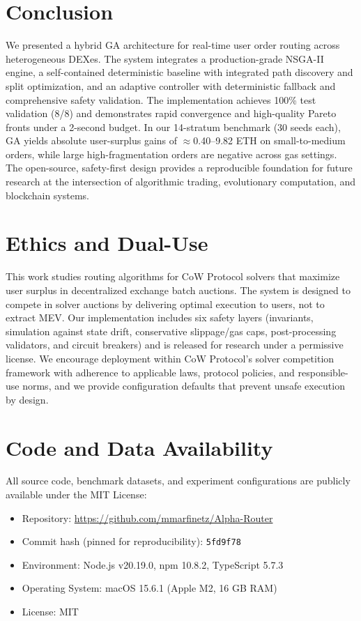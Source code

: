 \documentclass[11pt]{article}
\newcommand{\1}{\mathbf{1}}  %
\begin{document}
\section{Conclusion}
\label{sec:conclusion}
We presented a hybrid GA architecture for real-time user order routing across heterogeneous DEXes. The system integrates a production-grade NSGA-II engine, a self-contained deterministic baseline with integrated path discovery and split optimization, and an adaptive controller with deterministic fallback and comprehensive safety validation. The implementation achieves 100\% test validation (8/8) and demonstrates rapid convergence and high-quality Pareto fronts under a 2-second budget. In our 14-stratum benchmark (30 seeds each), GA yields absolute user-surplus gains of $\approx$0.40--9.82 ETH on small-to-medium orders, while large high-fragmentation orders are negative across gas settings. The open-source, safety-first design provides a reproducible foundation for future research at the intersection of algorithmic trading, evolutionary computation, and blockchain systems.

\section*{Ethics and Dual-Use}
This work studies routing algorithms for CoW Protocol solvers that maximize user surplus in decentralized exchange batch auctions. The system is designed to compete in solver auctions by delivering optimal execution to users, not to extract MEV. Our implementation includes six safety layers (invariants, simulation against state drift, conservative slippage/gas caps, post-processing validators, and circuit breakers) and is released for research under a permissive license. We encourage deployment within CoW Protocol's solver competition framework with adherence to applicable laws, protocol policies, and responsible-use norms, and we provide configuration defaults that prevent unsafe execution by design.

\section*{Code and Data Availability}
All source code, benchmark datasets, and experiment configurations are publicly available under the MIT License:
\begin{itemize}[leftmargin=*,nosep]
  \item Repository: \url{https://github.com/mmarfinetz/Alpha-Router}
  \item Commit hash (pinned for reproducibility): \texttt{5fd9f78}
  \item Environment: Node.js v20.19.0, npm 10.8.2, TypeScript 5.7.3
  \item Operating System: macOS 15.6.1 (Apple M2, 16 GB RAM)
  \item License: MIT
\end{itemize}
\end{document}

